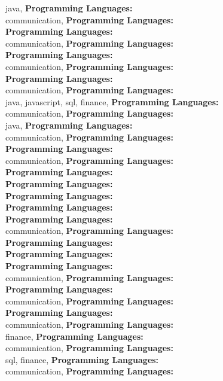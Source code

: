 java, \textbf{Programming Languages:} \\
communication, \textbf{Programming Languages:} \\
\textbf{Programming Languages:} \\
communication, \textbf{Programming Languages:} \\
\textbf{Programming Languages:} \\
communication, \textbf{Programming Languages:} \\
\textbf{Programming Languages:} \\
communication, \textbf{Programming Languages:} \\
java, javascript, sql, finance, \textbf{Programming Languages:} \\
communication, \textbf{Programming Languages:} \\
java, \textbf{Programming Languages:} \\
communication, \textbf{Programming Languages:} \\
\textbf{Programming Languages:} \\
communication, \textbf{Programming Languages:} \\
\textbf{Programming Languages:} \\
\textbf{Programming Languages:} \\
\textbf{Programming Languages:} \\
\textbf{Programming Languages:} \\
\textbf{Programming Languages:} \\
communication, \textbf{Programming Languages:} \\
\textbf{Programming Languages:} \\
\textbf{Programming Languages:} \\
\textbf{Programming Languages:} \\
communication, \textbf{Programming Languages:} \\
\textbf{Programming Languages:} \\
communication, \textbf{Programming Languages:} \\
\textbf{Programming Languages:} \\
communication, \textbf{Programming Languages:} \\
finance, \textbf{Programming Languages:} \\
communication, \textbf{Programming Languages:} \\
sql, finance, \textbf{Programming Languages:} \\
communication, \textbf{Programming Languages:} \\
